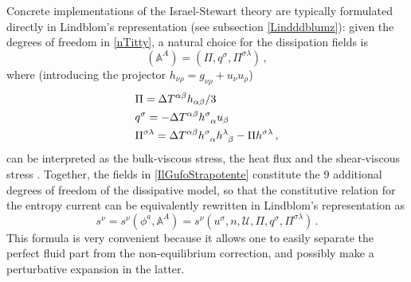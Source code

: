 \documentclass[a4paper, amsfonts, amssymb, amsmath, reprint, twocolumn, showkeys, nofootinbib]{revtex4-2}
\begin{document}
Concrete implementations of the Israel-Stewart theory are typically formulated directly in Lindblom's representation (see subsection \ref{Lindddblumz}): given the degrees of freedom in \eqref{nTitty},  a natural choice for the  dissipation fields is
\begin{equation}
\label{IlGufoStrapotente}
    (\mathbb{A}^A) = (\Pi,q^\sigma,\Pi^{\sigma \lambda}) \, ,
\end{equation}
where (introducing the projector $h_{\nu \rho}=g_{\nu \rho}+u_\nu u_\rho$)
\begin{equation}
\begin{split}
 & \Pi = \Delta T^{\alpha \beta} h_{\alpha \beta}/3 
\\
 & q^\sigma = -\Delta T^{\alpha \beta} h\indices{^\sigma _\alpha} u_\beta
\\
 & \Pi^{\sigma \lambda} = \Delta T^{\alpha \beta}  h\indices{^\sigma _\alpha}  h\indices{^\lambda _\beta} -\Pi h^{\sigma \lambda} \, , 
\end{split}
\end{equation}
can be interpreted as the bulk-viscous stress, the heat flux and the shear-viscous stress \cite{Liu1986}. 
Together, the fields in \eqref{IlGufoStrapotente} constitute the 9 additional degrees of freedom of the dissipative model, so that the constitutive relation for the entropy current can be equivalently rewritten in Lindblom's representation as 
\begin{equation}
    s^\nu =s^\nu (\phi^a,\mathbb{A}^A)= s^\nu (u^\sigma,n,\mathcal{U},\Pi,q^\sigma,\Pi^{\sigma \lambda}) \, .
\end{equation}
This formula is very convenient because it allows one to easily separate the perfect fluid part from the non-equilibrium correction, and possibly make a perturbative expansion in the latter.
\end{document}
